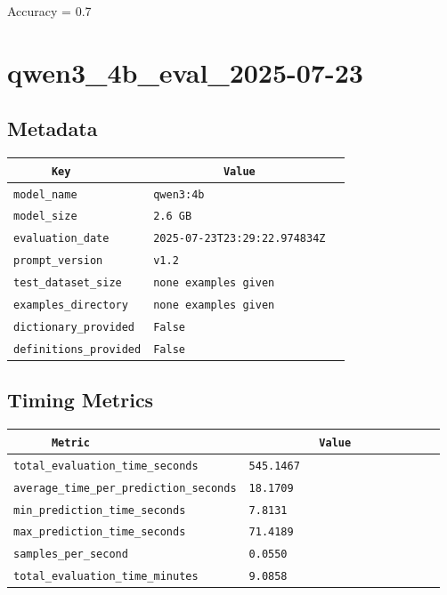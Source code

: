 \documentclass{article}
\begin{document}
\begin{center}
Accuracy = 0.7
\end{center}

\section{qwen3\_4b\_eval\_2025-07-23}
\subsection{Metadata}

\begin{center}
\begin{tabular}{l | l} \hline
    \verb|      Key      | & \verb|           Value           | \\ \hline
    \hline
    \verb|model_name    | & \verb|qwen3:4b                     | \\ \hline
    \verb|model_size    | & \verb|2.6 GB                       | \\ \hline
    \verb|evaluation_date| & \verb|2025-07-23T23:29:22.974834Z  | \\ \hline
    \verb|prompt_version| & \verb|v1.2                         | \\ \hline
    \verb|test_dataset_size| & \verb|none examples given          | \\ \hline
    \verb|examples_directory| & \verb|none examples given          | \\ \hline
    \verb|dictionary_provided| & \verb|False                        | \\ \hline
    \verb|definitions_provided| & \verb|False                        | \\ \hline
\end{tabular}
\end{center}

\subsection{Timing Metrics}

\begin{center}
\begin{tabular}{l | l} \hline
    \verb|      Metric     | & \verb|           Value           | \\ \hline
    \hline
    \verb|total_evaluation_time_seconds| & \verb|545.1467                     | \\ \hline
    \verb|average_time_per_prediction_seconds| & \verb|18.1709                      | \\ \hline
    \verb|min_prediction_time_seconds| & \verb|7.8131                       | \\ \hline
    \verb|max_prediction_time_seconds| & \verb|71.4189                      | \\ \hline
    \verb|samples_per_second| & \verb|0.0550                       | \\ \hline
    \verb|total_evaluation_time_minutes| & \verb|9.0858                       | \\ \hline
\end{tabular}
\end{center}
\end{document}
